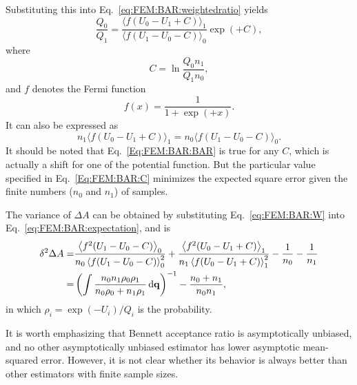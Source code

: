 Substituting this into Eq.~\ref{eq:FEM:BAR:weightedratio} yields
\begin{equation}
	\frac{Q_{0}}{Q_{1}}=\frac{\langle f(U_{0}-U_{1}+C)\rangle_{1}}{\langle f(U_{1}-U_{0}-C)\rangle_{0}}\exp{(+C)},
	\label{Eq:FEM:BAR:BAR}
\end{equation}
where
\begin{equation}
	C=\ln\frac{Q_{0}n_{1}}{Q_{1}n_{0}},
	\label{Eq:FEM:BAR:C}
\end{equation}
and $f$ denotes the Fermi function
\begin{equation}
	f(x)=\frac{1}{1+\exp{(+x)}}.
\end{equation}
It can also be expressed as\cite{ShirtsPRL2003}
\begin{equation}
	n_1\langle f(U_{0}-U_{1}+C)\rangle_{1}=n_0\langle f(U_{1}-U_{0}-C)\rangle_{0}.
\end{equation}
It should be noted that Eq.~\ref{Eq:FEM:BAR:BAR} is true for any $C$, which is actually a shift for one of the potential function. But the particular value specified in Eq.~\ref{Eq:FEM:BAR:C} minimizes the expected square error given the finite numbers ($n_0$ and $n_1$) of samples.

The variance of $\Delta A$ can be obtained by substituting Eq.~\ref{eq:FEM:BAR:W} into Eq.~\ref{eq:FEM:BAR:expectation}, and is 
\begin{align}
	\delta^2 \Delta A =&\frac{\left<f^2(U_{1}-U_{0}-C)\right>_0}{n_0\left<f(U_{1}-U_{0}-C)\right>_0^2}+\frac{\left<f^2(U_{0}-U_{1}+C)\right>_1}{n_1\left<f(U_{0}-U_{1}+C)\right>_1^2}-\frac{1}{n_0}-\frac{1}{n_1}\notag\\
	=&\left(\int \frac{n_0n_1\rho_0\rho_1}{n_0\rho_0+n_1\rho_1}\mathop{}\!\mathrm{d} \mathbf{q}\right)^{-1}-\frac{n_0+n_1}{n_0n_1},
\end{align}
in which $\rho_i=\exp{(-U_i)}/Q_i$ is the probability.

It is worth emphasizing that Bennett acceptance ratio is asymptotically unbiased, and no other asymptotically unbiased estimator has lower asymptotic mean-squared error. However, it is not clear whether its behavior is always better than other estimators with finite sample sizes.